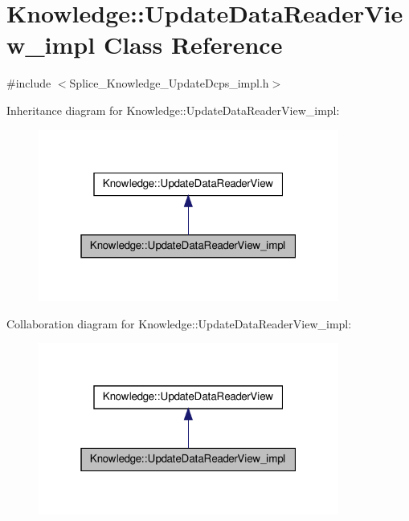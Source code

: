 \hypertarget{classKnowledge_1_1UpdateDataReaderView__impl}{
\section{Knowledge::UpdateDataReaderView\_\-impl Class Reference}
\label{d4/d06/classKnowledge_1_1UpdateDataReaderView__impl}
}


{\ttfamily \#include $<$Splice\_\-Knowledge\_\-UpdateDcps\_\-impl.h$>$}



Inheritance diagram for Knowledge::UpdateDataReaderView\_\-impl:
\nopagebreak
\begin{figure}[H]
\begin{center}
\leavevmode
\includegraphics[width=280pt]{dd/d33/classKnowledge_1_1UpdateDataReaderView__impl__inherit__graph}
\end{center}
\end{figure}


Collaboration diagram for Knowledge::UpdateDataReaderView\_\-impl:
\nopagebreak
\begin{figure}[H]
\begin{center}
\leavevmode
\includegraphics[width=280pt]{d0/da4/classKnowledge_1_1UpdateDataReaderView__impl__coll__graph}
\end{center}
\end{figure}
